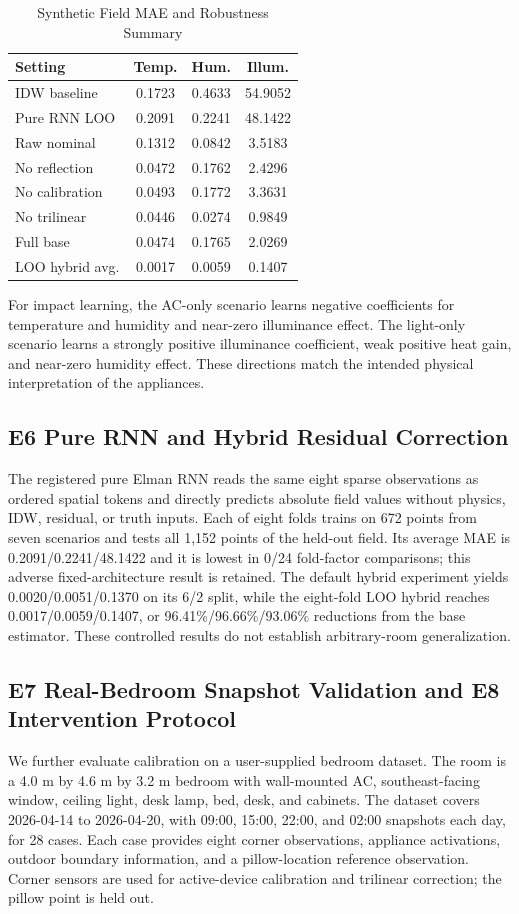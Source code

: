 \documentclass[conference,a4paper]{IEEEtran}
\begin{document}
\begin{table}[t]
\caption{Synthetic Field MAE and Robustness Summary}
\label{tab:synthetic}
\centering
\scriptsize
\begin{tabular}{|l|c|c|c|}
\hline
Setting & Temp. & Hum. & Illum.\\
\hline
IDW baseline & 0.1723 & 0.4633 & 54.9052\\
Pure RNN LOO & 0.2091 & 0.2241 & 48.1422\\
Raw nominal & 0.1312 & 0.0842 & 3.5183\\
No reflection & 0.0472 & 0.1762 & 2.4296\\
No calibration & 0.0493 & 0.1772 & 3.3631\\
No trilinear & 0.0446 & 0.0274 & 0.9849\\
Full base & 0.0474 & 0.1765 & 2.0269\\
LOO hybrid avg. & 0.0017 & 0.0059 & 0.1407\\
\hline
\end{tabular}
\end{table}

For impact learning, the AC-only scenario learns negative coefficients for temperature and humidity and near-zero illuminance effect. The light-only scenario learns a strongly positive illuminance coefficient, weak positive heat gain, and near-zero humidity effect. These directions match the intended physical interpretation of the appliances.

\subsection{E6 Pure RNN and Hybrid Residual Correction}
The registered pure Elman RNN reads the same eight sparse observations as ordered spatial tokens and directly predicts absolute field values without physics, IDW, residual, or truth inputs. Each of eight folds trains on 672 points from seven scenarios and tests all 1,152 points of the held-out field. Its average MAE is 0.2091/0.2241/48.1422 and it is lowest in 0/24 fold-factor comparisons; this adverse fixed-architecture result is retained. The default hybrid experiment yields 0.0020/0.0051/0.1370 on its 6/2 split, while the eight-fold LOO hybrid reaches 0.0017/0.0059/0.1407, or 96.41\%/96.66\%/93.06\% reductions from the base estimator. These controlled results do not establish arbitrary-room generalization.

\subsection{E7 Real-Bedroom Snapshot Validation and E8 Intervention Protocol}
We further evaluate calibration on a user-supplied bedroom dataset. The room is a 4.0 m by 4.6 m by 3.2 m bedroom with wall-mounted AC, southeast-facing window, ceiling light, desk lamp, bed, desk, and cabinets. The dataset covers 2026-04-14 to 2026-04-20, with 09:00, 15:00, 22:00, and 02:00 snapshots each day, for 28 cases. Each case provides eight corner observations, appliance activations, outdoor boundary information, and a pillow-location reference observation. Corner sensors are used for active-device calibration and trilinear correction; the pillow point is held out.
\end{document}
